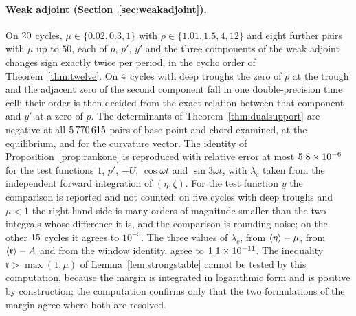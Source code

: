 \paragraph{Weak adjoint (Section~\ref{sec:weakadjoint}).}
On $20$ cycles, $\mu\in\{0.02,0.3,1\}$ with $\rho\in\{1.01,1.5,4,12\}$ and eight further pairs with $\mu$ up to $50$, each of $p$, $p'$, $y'$ and the three components of the weak adjoint changes sign exactly twice per period, in the cyclic order of Theorem~\ref{thm:twelve}. On $4$ cycles with deep troughs the zero of $p$ at the trough and the adjacent zero of the second component fall in one double-precision time cell; their order is then decided from the exact relation between that component and $y'$ at a zero of $p$. The determinants of Theorem~\ref{thm:dualsupport} are negative at all $5\,770\,615$ pairs of base point and chord examined, at the equilibrium, and for the curvature vector. The identity of Proposition~\ref{prop:rankone} is reproduced with relative error at most $5.8\times10^{-6}$ for the test functions $1$, $p'$, $-U$, $\cos\omega t$ and $\sin3\omega t$, with $\lambda_c$ taken from the independent forward integration of $(\eta,\zeta)$. For the test function $y$ the comparison is reported and not counted: on five cycles with deep troughs and $\mu<1$ the right-hand side is many orders of magnitude smaller than the two integrals whose difference it is, and the comparison is rounding noise; on the other $15$ cycles it agrees to $10^{-5}$. The three values of $\lambda_c$, from $\left\langle \eta\right\rangle-\mu$, from $\left\langle \mathfrak r\right\rangle-A$ and from the window identity, agree to $1.1\times10^{-11}$. The inequality $\mathfrak r>\max(1,\mu)$ of Lemma~\ref{lem:strongstable} cannot be tested by this computation, because the margin is integrated in logarithmic form and is positive by construction; the computation confirms only that the two formulations of the margin agree where both are resolved.

